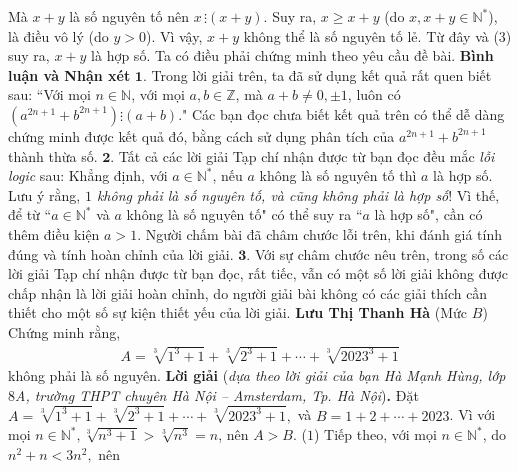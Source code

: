 \begin{multicols}{2}
	Mà $x + y$ là số nguyên tố nên $x \,\vdots \left( {x + y} \right)$.  Suy ra, $x \ge  x + y$ (do $x, x + y \in \mathbb{N^*}$), là điều vô lý (do $y > 0$). Vì vậy, $x + y$ không thể là số nguyên tố lẻ. Từ đây và ($3$) suy ra, $x + y$ là hợp số.
	\vskip 0.05cm
	Ta có điều phải chứng minh theo yêu cầu đề bài.
	\vskip 0.05cm
	\textbf{\color{thachthuctoanhoc}Bình luận và Nhận xét}
	\vskip 0.05cm
	$\pmb{1.}$ Trong lời giải trên, ta đã sử dụng kết quả rất quen biết sau:
	\vskip 0.05cm
	``Với mọi $n \in \mathbb{N}$, với mọi  $a,b \in \mathbb{Z}$, mà $a + b \ne  0, \pm 1$, luôn có  $\left( {{a^{2n + 1}} + {b^{2n + 1}}} \right) \vdots \left( {a + b} \right).$"
	\vskip 0.05cm
	Các bạn đọc chưa biết kết quả trên có thể dễ dàng chứng minh được kết quả đó, bằng cách sử dụng phân tích của ${a^{2n + 1}} + {b^{2n + 1}}$ thành thừa số.
	\vskip 0.05cm
	$\pmb{2.}$ Tất cả các lời giải Tạp chí nhận được từ bạn đọc đều mắc \textit{lỗi logic} sau: Khẳng định, với $a \in \mathbb{N^*}$, nếu $a$ không là số nguyên tố thì $a$ là hợp số.
	\vskip 0.05cm
	Lưu ý rằng, \textit{$1$ không phải là số nguyên tố, và cũng không phải là hợp số}! Vì thế, để từ ``$a \in \mathbb{N^*}$  và $a$ không là số nguyên tố" có thể suy ra ``$a$ là hợp số", cần có thêm điều kiện $a > 1$.
	\vskip 0.05cm
	Người chấm bài đã châm chước lỗi trên, khi đánh giá tính đúng và tính hoàn chỉnh của lời giải.
	\vskip 0.05cm
	$\pmb{3.}$ Với sự châm chước nêu trên, trong số các lời giải Tạp chí nhận được từ bạn đọc, rất tiếc, vẫn có một số lời giải không được chấp nhận là lời giải hoàn chỉnh, do người giải bài không có các giải thích cần thiết cho một số sự kiện thiết yếu của lời giải.
	\vskip 0.05cm
	\hfill\textbf{\color{thachthuctoanhoc}Lưu Thị Thanh Hà}
	\vskip 0.05cm
	{}
	(Mức $B$) Chứng minh rằng,
	\begin{align*}
		A\!=\!\sqrt[3]{1^3\!+\!1}\!+\!\sqrt[3]{2^3\!+\!1}\!+\!\cdots\!+\!\sqrt[3]{2023^3\!+\!1}
	\end{align*}
	không phải là số nguyên.
	\vskip 0.05cm
	\textbf{\color{thachthuctoanhoc}Lời giải} (\textit{dựa theo lời giải của bạn Hà Mạnh Hùng, lớp $8$A, trường THPT chuyên Hà Nội -- Amsterdam, Tp. Hà Nội})\textbf{\color{thachthuctoanhoc}.}
	\vskip 0.05cm
	Đặt $A = \sqrt[3]{{{1^3} + 1}} + \sqrt[3]{{{2^3} + 1}} +  \cdots  + \sqrt[3]{{{{2023}^3} + 1}},$  và $B = 1 + 2 +  \cdots  + 2023$.
	\vskip 0.05cm 
	Vì với mọi  $n \in \mathbb{N^*}, \sqrt[3]{{{n^3} + 1}} > \sqrt[3]{{{n^3}}} = n$, nên $A > B$. \hfill ($1$)
	\vskip 0.05cm      
	Tiếp theo, với mọi $n \in \mathbb{N^*}$, do ${n^2} + n < 3{n^2},$  nên

\end{multicols}
